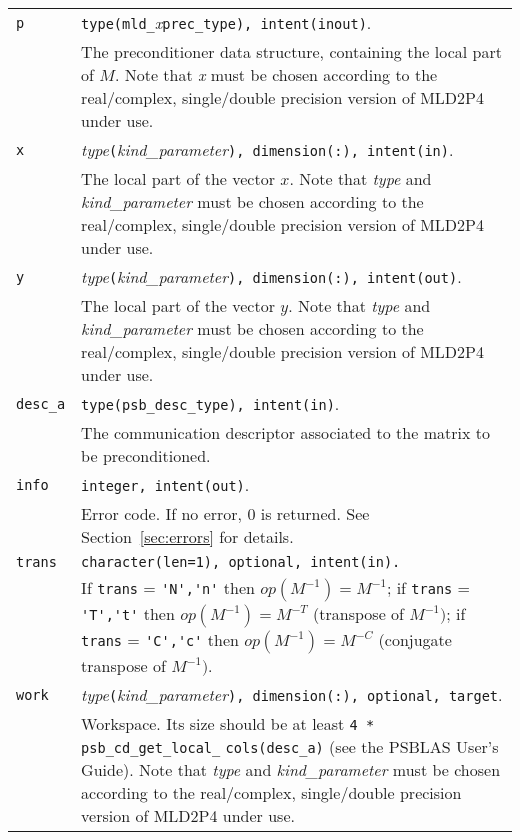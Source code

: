 \begin{tabular}{p{1.2cm}p{12cm}}
\verb|p|      & \verb|type(mld_|\emph{x}\verb|prec_type), intent(inout)|.\\
              & The preconditioner data structure, containing the local part of $M$.
                Note that \emph{x} must be chosen according
                to the real/complex, single/double precision version of MLD2P4 under use.\\
\verb|x|      & \emph{type}\verb|(|\emph{kind\_parameter}\verb|), dimension(:), intent(in)|.\\
              & The local part of the vector $x$. Note that \emph{type} and   
                \emph{kind\_parameter} must be chosen according
                to the real/complex, single/double precision version of MLD2P4 under use.\\
\verb|y|      & \emph{type}\verb|(|\emph{kind\_parameter}\verb|), dimension(:), intent(out)|.\\
              & The local part of the vector $y$. Note that \emph{type} and
                \emph{kind\_parameter} must be chosen according
                to the real/complex, single/double precision version of MLD2P4 under use.\\
\verb|desc_a| & \verb|type(psb_desc_type), intent(in)|. \\
              & The communication descriptor associated to the matrix to be
                preconditioned.\\
\verb|info|   & \verb|integer, intent(out)|.\\
              & Error code. If no error, 0 is returned. See Section~\ref{sec:errors} for details.\\
\verb|trans|  & \verb|character(len=1), optional, intent(in).|\\
              & If \verb|trans| = \verb|'N','n'| then $op(M^{-1}) = M^{-1}$;
                if \verb|trans| = \verb|'T','t'| then $op(M^{-1}) = M^{-T}$
                (transpose of $M^{-1})$;  if \verb|trans| = \verb|'C','c'| then $op(M^{-1}) = M^{-C}$
                (conjugate transpose of $M^{-1})$.\\
\verb|work|  & \emph{type}\verb|(|\emph{kind\_parameter}\verb|), dimension(:), optional, target|.\\
             & Workspace. Its size should be at
               least \verb|4 * psb_cd_get_local_| \verb|cols(desc_a)| (see the PSBLAS User's Guide).
               Note that \emph{type} and \emph{kind\_parameter} must be chosen according
               to the real/complex, single/double precision version of MLD2P4 under use.\\
\end{tabular}


